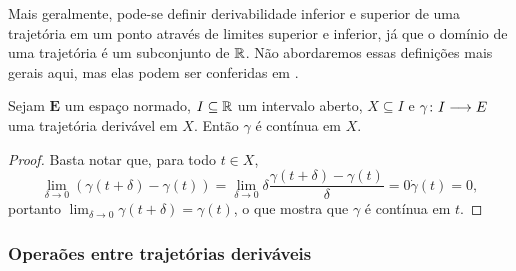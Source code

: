 Mais geralmente, pode-se definir derivabilidade inferior e superior de uma trajetória em um ponto através de limites superior e inferior, já que o domínio de uma trajetória é um subconjunto de $\mathbb{R}$. Não abordaremos essas definições mais gerais aqui, mas elas podem ser conferidas em \cite{liv:Cartan-DifferentialCalculus}.

\begin{proposition}
Sejam $\bm E$ um espaço normado, $I \subseteq \mathbb{R}$ um intervalo aberto, $X \subseteq I$ e $\gamma\colon \allowbreak I \longrightarrow E$ uma trajetória derivável em $X$. Então $\gamma$ é contínua em $X$.
\end{proposition}
\begin{proof}
Basta notar que, para todo $t \in X$,
	\begin{equation*}
	\lim_{\delta \to 0} (\gamma(t+\delta)-\gamma(t)) = \lim_{\delta \to 0} \delta\frac{\gamma(t+\delta)-\gamma(t)}{\delta} = 0\dot \gamma(t) = 0,
	\end{equation*}
portanto $\lim_{\delta \to 0} \gamma(t+\delta) = \gamma(t)$, o que mostra que $\gamma$ é contínua em $t$.
\end{proof}

\subsubsection{Operaões entre trajetórias deriváveis}

